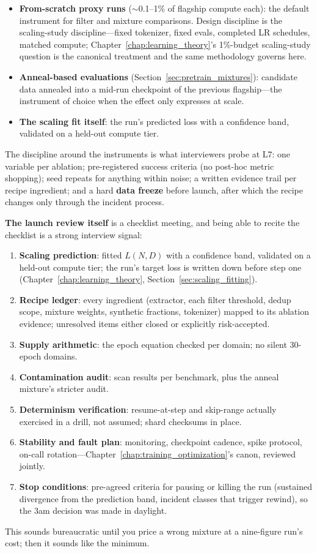 \begin{itemize}
    \item \textbf{From-scratch proxy runs} ($\sim$0.1--1\% of flagship compute each): the default instrument for filter and mixture comparisons. Design discipline is the scaling-study discipline---fixed tokenizer, fixed evals, completed LR schedules, matched compute; Chapter~\ref{chap:learning_theory}'s 1\%-budget scaling-study question is the canonical treatment and the same methodology governs here.
    \item \textbf{Anneal-based evaluations} (Section~\ref{sec:pretrain_mixtures}): candidate data annealed into a mid-run checkpoint of the previous flagship---the instrument of choice when the effect only expresses at scale.
    \item \textbf{The scaling fit itself}: the run's predicted loss with a confidence band, validated on a held-out compute tier.
\end{itemize}

The discipline around the instruments is what interviewers probe at L7: one variable per ablation; pre-registered success criteria (no post-hoc metric shopping); seed repeats for anything within noise; a written evidence trail per recipe ingredient; and a hard \textbf{data freeze} before launch, after which the recipe changes only through the incident process.

\textbf{The launch review itself} is a checklist meeting, and being able to recite the checklist is a strong interview signal:
\begin{enumerate}
    \item \textbf{Scaling prediction}: fitted $L(N, D)$ with a confidence band, validated on a held-out compute tier; the run's target loss is written down before step one (Chapter~\ref{chap:learning_theory}, Section~\ref{sec:scaling_fitting}).
    \item \textbf{Recipe ledger}: every ingredient (extractor, each filter threshold, dedup scope, mixture weights, synthetic fractions, tokenizer) mapped to its ablation evidence; unresolved items either closed or explicitly risk-accepted.
    \item \textbf{Supply arithmetic}: the epoch equation checked per domain; no silent 30-epoch domains.
    \item \textbf{Contamination audit}: scan results per benchmark, plus the anneal mixture's stricter audit.
    \item \textbf{Determinism verification}: resume-at-step and skip-range actually exercised in a drill, not assumed; shard checksums in place.
    \item \textbf{Stability and fault plan}: monitoring, checkpoint cadence, spike protocol, on-call rotation---Chapter~\ref{chap:training_optimization}'s canon, reviewed jointly.
    \item \textbf{Stop conditions}: pre-agreed criteria for pausing or killing the run (sustained divergence from the prediction band, incident classes that trigger rewind), so the 3am decision was made in daylight.
\end{enumerate}
This sounds bureaucratic until you price a wrong mixture at a nine-figure run's cost; then it sounds like the minimum.

